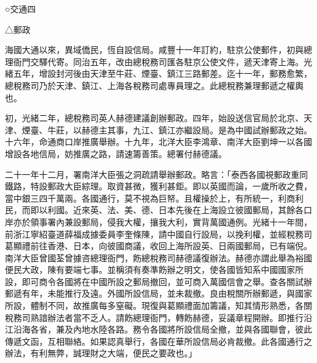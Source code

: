 
\begin{pinyinscope}
○交通四

△郵政

海國大通以來，異域僑民，恆自設信局。咸豐十一年訂約，駐京公使郵件，初與總理衙門交驛代寄。同治五年，改由總稅務司匯各駐京公使文件，遞天津寄上海。光緒五年，增設封河後由天津至牛莊、煙臺、鎮江三路郵差。迄十一年，郵務愈繁，總稅務司乃於天津、鎮江、上海各稅務司處專員理之。此總稅務兼理郵遞之權輿也。

初，光緒二年，總稅務司英人赫德建議創辦郵政。四年，始設送信官局於北京、天津、煙臺、牛莊，以赫德主其事，九江、鎮江亦繼設局。是為中國試辦郵政之始。十六年，命通商口岸推廣舉辦。十九年，北洋大臣李鴻章、南洋大臣劉坤一以各國增設各地信局，妨推廣之路，請速籌善策。總署付赫德議。

二十一年十二月，署南洋大臣張之洞疏請舉辦郵政。略言：「泰西各國視郵政重同鐵路，特設郵政大臣綜理。取資甚微，獲利甚鉅。即以英國而論，一歲所收之費，當中銀三四千萬兩。各國通行，莫不視為巨帑。且權操於上，有所統一，利商利民，而即以利國。近來英、法、美、德、日本先後在上海設立彼國郵局，其餘各口岸亦於領事署內兼設郵局，侵我大權，攘我大利，實背萬國通例。光緒十一年間，前浙江寧紹臺道薛福成據委員李奎條陳，請中國自行設局，以挽利權，並經稅務司葛顯禮前往香港、日本，向彼國商議，收回上海所設英、日兩國郵局，已有端倪。南洋大臣曾國荃曾據咨總理衙門，飭總稅務司赫德議復辦法。赫德亦謂此舉為裕國便民大政，陳有要端七事。並稱須有奏準飭辦之明文，使各國皆知系中國國家所設，即可商令各國將在中國所設之郵局撤回，並可商入萬國信會之舉。查各關試辦郵遞有年，未能推行及遠。外國所設信局，並未裁撤。良由稅關所辦郵遞，與國家所設，體制不同，故推廣每多窒礙。現復與葛顯禮面加籌議，知其情形熟悉，各關稅務司熟諳辦法者當不乏人。請飭總理衙門，轉飭赫德，妥議章程開辦。即推行沿江沿海各省，兼及內地水陸各路。務令各國將所設信局全撤，並與各國聯會，彼此傳遞文函，互相聯絡。如果認真舉行，各國在華所設信局必肯裁撤。此各國通行之辦法，有利無弊，誠理財之大端，便民之要政也。」


\end{pinyinscope}
